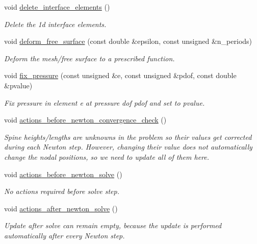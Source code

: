 \begin{DoxyCompactItemize}
void \hyperlink{classInterfaceProblem_ac2aaab086d9bbd3913ce8bc0d244413d}{delete\+\_\+interface\+\_\+elements} ()
\begin{DoxyCompactList}\small\item\em Delete the 1d interface elements. \end{DoxyCompactList}\item 
void \hyperlink{classInterfaceProblem_a2319232b08d9df1ab473f6cbd40939d5}{deform\+\_\+free\+\_\+surface} (const double \&epsilon, const unsigned \&n\+\_\+periods)
\begin{DoxyCompactList}\small\item\em Deform the mesh/free surface to a prescribed function. \end{DoxyCompactList}\item 
void \hyperlink{classInterfaceProblem_a9d1a04da451b6f41336cb6f3bd910633}{fix\+\_\+pressure} (const unsigned \&e, const unsigned \&pdof, const double \&pvalue)
\begin{DoxyCompactList}\small\item\em Fix pressure in element e at pressure dof pdof and set to pvalue. \end{DoxyCompactList}\item 
void \hyperlink{classInterfaceProblem_ab4193771472aefce4cd67261491cc344}{actions\+\_\+before\+\_\+newton\+\_\+convergence\+\_\+check} ()
\begin{DoxyCompactList}\small\item\em Spine heights/lengths are unknowns in the problem so their values get corrected during each Newton step. However, changing their value does not automatically change the nodal positions, so we need to update all of them here. \end{DoxyCompactList}\item 
void \hyperlink{classInterfaceProblem_ade63c8a74f666edf530460b989968b4f}{actions\+\_\+before\+\_\+newton\+\_\+solve} ()
\begin{DoxyCompactList}\small\item\em No actions required before solve step. \end{DoxyCompactList}\item 
void \hyperlink{classInterfaceProblem_aedc2e58b3d2f5f8c898a21ba2d245cee}{actions\+\_\+after\+\_\+newton\+\_\+solve} ()
\begin{DoxyCompactList}\small\item\em Update after solve can remain empty, because the update is performed automatically after every Newton step. \end{DoxyCompactList}\item 

\end{DoxyCompactItemize}
